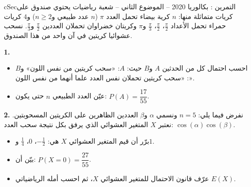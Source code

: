 \documentclass[12pt,a4paper]{article}
\newenvironment{BOX}[2]{\begin{otherlanguage}{english}\begin{arbox}{#1}{#2}}{\end{arbox}\end{otherlanguage}}
\newcounter{exo}
\newenvironment{tamrin}[1]{\stepcounter{exo}\begin{BOX}{cSec}{التمرين \theexo: #1}}{\end{BOX}}
\newenvironment{sq}{\begin{itemize}[leftmargin=2.4em,itemsep=3pt]}{\end{itemize}}
\newcommand{\qa}{\item[(أ)]}\newcommand{\qb}{\item[(ب)]}\newcommand{\qc}{\item[(جـ)]}\newcommand{\qd}{\item[(د)]}\newcommand{\qe}{\item[(هـ)]}
\newcommand{\QQ}[1]{\par\smallskip\textbf{#1.} }
\begin{document}
\begin{tamrin}{بكالوريا 2020 -- الموضوع الثاني -- شعبة رياضيات}
يحتوي صندوق على كريات متماثلة منها: $n$ كرية بيضاء تحمل العدد $\pi$ ($n$ عدد طبيعي و$n\geqslant2$) و$4$ كريات حمراء تحمل الأعداد $\frac{\pi}{2}$، $\frac{\pi}{2}$، $\frac{\pi}{3}$ و$\pi$ وكريتان خضراوان تحملان العددين $\frac{\pi}{2}$ و$\frac{\pi}{3}$.
نسحب عشوائيا كريتين في آن واحد من هذا الصندوق.

\QQ{1}
\begin{sq}
\qa احسب احتمال كل من الحدثين $A$ و$B$ حيث: $A$: «سحب كريتين من نفس اللون» و$B$: «سحب كريتين تحملان نفس العدد علما أنهما من نفس اللون».
\qb عيّن العدد الطبيعي $n$ حتى يكون: $P(A)=\dfrac{17}{55}$.
\end{sq}
\QQ{2} نفرض فيما يلي: $n=5$ ونسمي $\alpha$ و$\beta$ العددين الظاهرين على الكريتين المسحوبتين.
نعتبر $X$ المتغير العشوائي الذي يرفق بكل نتيجة سحب العدد: $\cos(\alpha)\cos(\beta)$.
\begin{sq}
\qa برّر أن قيم المتغير العشوائي $X$ هي: $-\frac12$، $0$، $\frac14$ و$1$.
\qb بيّن أن: $P(X=0)=\dfrac{27}{55}$.
\qc عرّف قانون الاحتمال للمتغير العشوائي $X$، ثم احسب أمله الرياضياتي $E(X)$.
\end{sq}
\end{tamrin}
\end{document}
